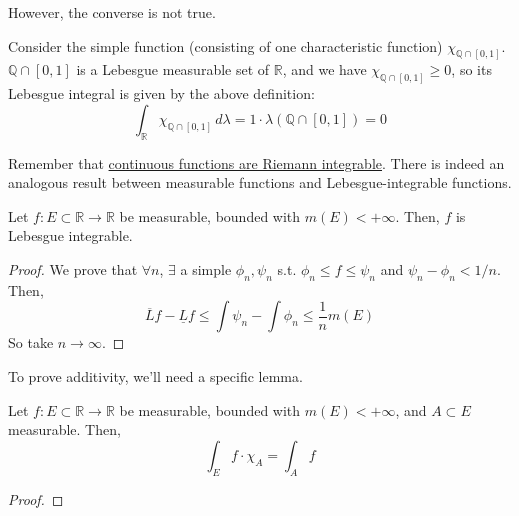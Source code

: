   However, the converse is not true. 

  \begin{example}
    Consider the simple function (consisting of one characteristic function) $\chi_{\mathbb{Q} \cap [0, 1]}$. $\mathbb{Q} \cap [0, 1]$ is a Lebesgue measurable set of $\mathbb{R}$, and we have $\chi_{\mathbb{Q} \cap [0, 1]} \geq 0$, so its Lebesgue integral is given by the above definition: 
    \begin{equation}
      \int_{\mathbb{R}} \chi_{\mathbb{Q} \cap [0, 1]} \, d\lambda = 1 \cdot \lambda(\mathbb{Q} \cap [0, 1]) = 0
    \end{equation}
  \end{example} 

  Remember that \hyperref[real-thm:continuous-riemann]{continuous functions are Riemann integrable}. There is indeed an analogous result between measurable functions and Lebesgue-integrable functions. 

  \begin{theorem}
    Let $f: E \subset \mathbb{R} \to \mathbb{R}$ be measurable, bounded with $m(E) < +\infty$. Then, $f$ is Lebesgue integrable. 
  \end{theorem}
  \begin{proof}
    We prove that $\forall n$, $\exists$ a simple $\phi_n, \psi_n$ s.t. $\phi_n \leq f \leq \psi_n$  and $\psi_n - \phi_n < 1/n$. Then, 
    \begin{equation}
      \overline{L} f - \underline{L} f \leq \int \psi_n - \int \phi_n \leq \frac{1}{n} m(E)
    \end{equation}
    So take $n \to \infty$. 
  \end{proof}

  To prove additivity, we'll need a specific lemma. 

  \begin{lemma}[]
    Let $f: E \subset \mathbb{R} \to \mathbb{R}$ be measurable, bounded with $m(E) < +\infty$, and $A \subset E$ measurable. Then, 
    \begin{equation}
      \int_E f \cdot \chi_A = \int_A f
    \end{equation}
  \end{lemma}
  \begin{proof}
    
  \end{proof}

